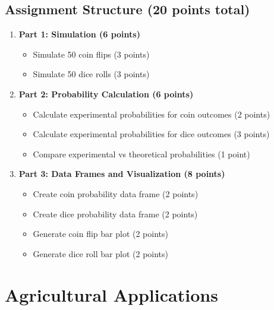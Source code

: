 \documentclass[11pt,a4paper]{article}
\begin{document}
\subsection{Assignment Structure (20 points total)}

\begin{enumerate}
    \item \textbf{Part 1: Simulation (6 points)}
    \begin{itemize}
        \item Simulate 50 coin flips (3 points)
        \item Simulate 50 dice rolls (3 points)
    \end{itemize}
    
    \item \textbf{Part 2: Probability Calculation (6 points)}
    \begin{itemize}
        \item Calculate experimental probabilities for coin outcomes (2 points)
        \item Calculate experimental probabilities for dice outcomes (3 points)
        \item Compare experimental vs theoretical probabilities (1 point)
    \end{itemize}
    
    \item \textbf{Part 3: Data Frames and Visualization (8 points)}
    \begin{itemize}
        \item Create coin probability data frame (2 points)
        \item Create dice probability data frame (2 points)
        \item Generate coin flip bar plot (2 points)
        \item Generate dice roll bar plot (2 points)
    \end{itemize}
\end{enumerate}

\section{Agricultural Applications}
\end{document}
